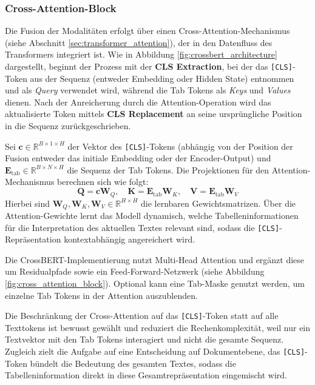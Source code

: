 \subsubsection{Cross-Attention-Block}
Die Fusion der Modalitäten erfolgt über einen Cross-Attention-Mechanismus (siehe Abschnitt \ref{sec:transformer_attention}), der in den Datenfluss des Transformers integriert ist. Wie in Abbildung \ref{fig:crossbert_architecture} dargestellt, beginnt der Prozess mit der \textbf{CLS Extraction}, bei der das \texttt{[CLS]}-Token aus der Sequenz (entweder Embedding oder Hidden State) entnommen und als \textit{Query} verwendet wird, während die Tab Tokens als \textit{Keys} und \textit{Values} dienen. Nach der Anreicherung durch die Attention-Operation wird das aktualisierte Token mittels \textbf{CLS Replacement} an seine ursprüngliche Position in die Sequenz zurückgeschrieben.

Sei $\mathbf{c} \in \mathbb{R}^{B \times 1 \times H}$ der Vektor des \texttt{[CLS]}-Tokens (abhängig von der Position der Fusion entweder das initiale Embedding oder der Encoder-Output) und $\mathbf{E}_{\text{tab}} \in \mathbb{R}^{B \times N \times H}$ die Sequenz der Tab Tokens. Die Projektionen für den Attention-Mechanismus berechnen sich wie folgt:
\begin{equation}
    \mathbf{Q} = \mathbf{c} \mathbf{W}_Q,\quad \mathbf{K} = \mathbf{E}_{\text{tab}} \mathbf{W}_K,\quad \mathbf{V} = \mathbf{E}_{\text{tab}} \mathbf{W}_V
\end{equation}
Hierbei sind $\mathbf{W}_Q, \mathbf{W}_K, \mathbf{W}_V \in \mathbb{R}^{H \times H}$ die lernbaren Gewichtsmatrizen. Über die Attention-Gewichte lernt das Modell dynamisch, welche Tabelleninformationen für die Interpretation des aktuellen Textes relevant sind, sodass die \texttt{[CLS]}-Repräsentation kontextabhängig angereichert wird.

Die CrossBERT-Implementierung nutzt Multi-Head Attention und ergänzt diese um Residualpfade sowie ein Feed-Forward-Netzwerk (siehe Abbildung \ref{fig:cross_attention_block}). Optional kann eine Tab-Maske genutzt werden, um einzelne Tab Tokens in der Attention auszublenden.

Die Beschränkung der Cross-Attention auf das \texttt{[CLS]}-Token statt auf alle Texttokens ist bewusst gewählt und reduziert die Rechenkomplexität, weil nur ein Textvektor mit den Tab Tokens interagiert und nicht die gesamte Sequenz. Zugleich zielt die Aufgabe auf eine Entscheidung auf Dokumentebene, das \texttt{[CLS]}-Token bündelt die Bedeutung des gesamten Textes, sodass die Tabelleninformation direkt in diese Gesamtrepräsentation eingemischt wird.

